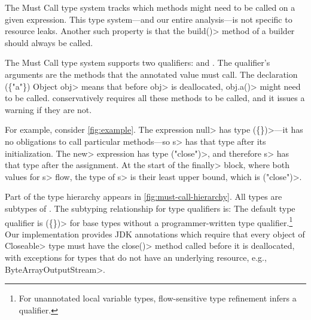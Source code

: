 The Must Call type system tracks which methods might need to be called
on a given expression.  This type system---and
our entire analysis---is not specific to resource leaks. Another such
  property is that the
  \<build()> method of a builder~\cite{designpatterns} should always
  be called.

The Must Call type system supports two qualifiers: \MustCall and
\MustCallUnknown. The \MustCall qualifier's arguments are the
methods that
the annotated value
must call. The declaration
\MustCall\<(\{"a"\}) Object obj> means that before \<obj> is
deallocated, \<obj.a()> might need to be called.
\Tool conservatively requires all these methods to be called,
and it issues a warning if they are not.

For example, consider \cref{fig:example}. The expression \<null> has type
\MustCall\<(\{\})>---it has no obligations
to call particular methods---so \<s> has that type after its initialization.
The \<new> expression has type \MustCall\<("close")>, and therefore
\<s> has that type after the assignment.
At the start of the \<finally> block, where both values for \<s> flow,
the type of \<s> is their least upper bound, which is \MustCall\<("close")>.


Part of the type hierarchy appears in \cref{fig:must-call-hierarchy}.
All types are subtypes of \MustCallUnknown.
The subtyping relationship for \MustCall type qualifiers is:
The default type qualifier is \MustCall\<(\{\})> for base types without a
programmer-written type qualifier.\footnote{For unannotated local variable types,
  flow-sensitive type refinement infers a qualifier.}
Our implementation
provides JDK annotations which require that every 
object of \<Closeable> type must have the \<close()> method called before
it is deallocated, with exceptions for types that do not have an underlying
resource, e.g., \<ByteArrayOutputStream>.

